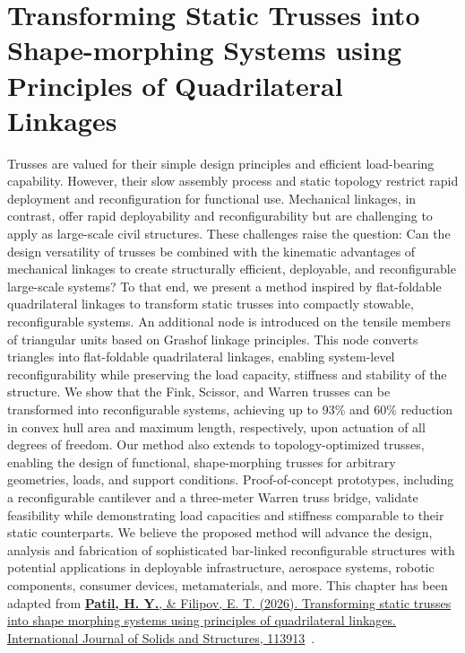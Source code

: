 \chapter{Transforming Static Trusses into Shape-morphing Systems using Principles of Quadrilateral Linkages}\label{chapter-02}
Trusses are valued for their simple design principles and efficient load-bearing capability. However, their slow assembly process and static topology restrict rapid deployment and reconfiguration for functional use. Mechanical linkages, in contrast, offer rapid deployability and reconfigurability but are challenging to apply as large-scale civil structures. These challenges raise the question: Can the design versatility of trusses be combined with the kinematic advantages of mechanical linkages to create structurally efficient, deployable, and reconfigurable large-scale systems? To that end, we present a method inspired by flat-foldable quadrilateral linkages to transform static trusses into compactly stowable, reconfigurable systems. An additional node is introduced on the tensile members of triangular units based on Grashof linkage principles. This node converts triangles into flat-foldable quadrilateral linkages, enabling system-level reconfigurability while preserving the load capacity, stiffness and stability of the structure. We show that the Fink, Scissor, and Warren trusses can be transformed into reconfigurable systems, achieving up to 93\% and 60\% reduction in convex hull area and maximum length, respectively, upon actuation of all degrees of freedom. Our method also extends to topology-optimized trusses, enabling the design of functional, shape-morphing trusses for arbitrary geometries, loads, and support conditions. Proof-of-concept prototypes, including a reconfigurable cantilever and a three-meter Warren truss bridge, validate feasibility while demonstrating load capacities and stiffness comparable to their static counterparts. We believe the proposed method will advance the design, analysis and fabrication of sophisticated bar-linked reconfigurable structures with potential applications in deployable infrastructure, aerospace systems, robotic components, consumer devices, metamaterials, and more. This chapter has been adapted from \href{https://doi.org/10.1016/j.ijsolstr.2026.113913}{\textbf{Patil, H. Y.}, \& Filipov, E. T. (2026). Transforming static trusses into shape morphing systems using principles of quadrilateral linkages. International Journal of Solids and Structures, 113913}~\cite{patil2026truss}.

